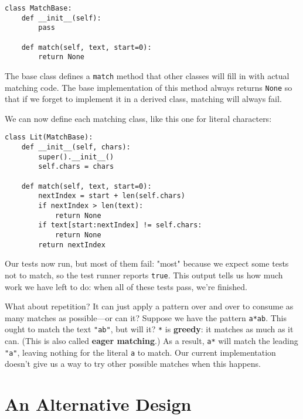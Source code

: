 \documentclass{scrbook}
\newcommand{\glossref}[1]{\textbf{#1}}
\begin{document}
\begin{lstlisting}[frame=single,frameround=tttt]
class MatchBase:
    def __init__(self):
        pass

    def match(self, text, start=0):
        return None
\end{lstlisting}



\noindent The base class defines a \texttt{match} method
that other classes will fill in with actual matching code.
The base implementation of this method always returns \texttt{None}
so that if we forget to implement it in a derived class,
matching will always fail.


We can now define each matching class,
like this one for literal characters:


\begin{lstlisting}[frame=single,frameround=tttt]
class Lit(MatchBase):
    def __init__(self, chars):
        super().__init__()
        self.chars = chars

    def match(self, text, start=0):
        nextIndex = start + len(self.chars)
        if nextIndex > len(text):
            return None
        if text[start:nextIndex] != self.chars:
            return None
        return nextIndex
\end{lstlisting}



\noindent Our tests now run, but most of them fail:
"most" because we expect some tests not to match,
so the test runner reports \texttt{true}.
This output tells us how much work we have left to do:
when all of these tests pass,
we're finished.


What about repetition?
It can just apply a pattern over and over to consume as many matches as possible—or can it?
Suppose we have the pattern \texttt{a*ab}.
This ought to match the text \texttt{"ab"}, but will it?
\texttt{*} is \glossref{greedy}:
it matches as much as it can.
(This is also called \glossref{eager matching}.)
As a result,
\texttt{a*} will match the leading \texttt{"a"}, leaving nothing for the literal \texttt{a} to match.
Our current implementation doesn't give us a way to try other possible matches when this happens.

\section{An Alternative Design}\label{matching-alternative}
\end{document}
